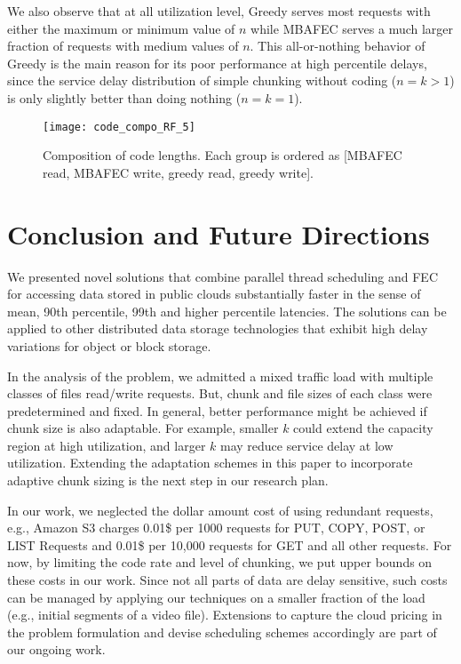 \documentclass[journal]{IEEEtran}
\newcommand{\multiclass}{{MBAFEC}\xspace}
\begin{document}
We also observe that at all utilization level, Greedy serves most  requests with either the maximum or minimum value of $n$ while \multiclass serves a much larger fraction of requests with medium values of $n$. This all-or-nothing behavior of Greedy is the main reason for its poor performance at high percentile delays, since the service delay distribution of simple chunking without coding ($n=k>1$) is only slightly better than doing nothing ($n=k=1$).



\begin{figure}[t]
\centering
\texttt{[image: code\_compo\_RF\_5]}
\vspace{-10pt}
\caption{Composition of code lengths. Each group is ordered as [\multiclass read, \multiclass write, greedy read, greedy write].}
\label{fig:code_compo}
\vspace{-15pt}
\end{figure}



\section{Conclusion and Future Directions}
\label{sec:conclusion}
We presented novel solutions that combine parallel thread scheduling and FEC for accessing data stored in public clouds substantially faster in the sense of mean, 90th percentile, 99th and higher percentile latencies. The solutions can be applied to other distributed data storage technologies that exhibit high delay variations for object or block storage. 

In the analysis of the problem, we admitted a mixed traffic load with multiple classes of files read/write requests. But, chunk and file sizes of each class were predetermined and fixed. 
In general, better performance might be achieved if chunk size is also adaptable. For example, smaller $k$ could extend the capacity region at high utilization, and larger $k$ may reduce service delay at low utilization. Extending the adaptation schemes in this paper to incorporate adaptive chunk sizing is the next step in our research plan.


In our work, we neglected the dollar amount cost of using redundant requests, e.g., Amazon S3 charges 0.01\$ per 1000 requests for PUT, COPY, POST, or LIST Requests and 0.01\$ per 10,000 requests for GET and all other requests. For now, by limiting the code rate and level of chunking, we put upper bounds on these costs in our work. Since not all parts of data are delay sensitive, such costs can be managed by applying our techniques on a smaller fraction of the load (e.g., initial segments of a video file). Extensions to capture the cloud pricing in the problem formulation and devise scheduling schemes accordingly are part of our ongoing work.
\end{document}
